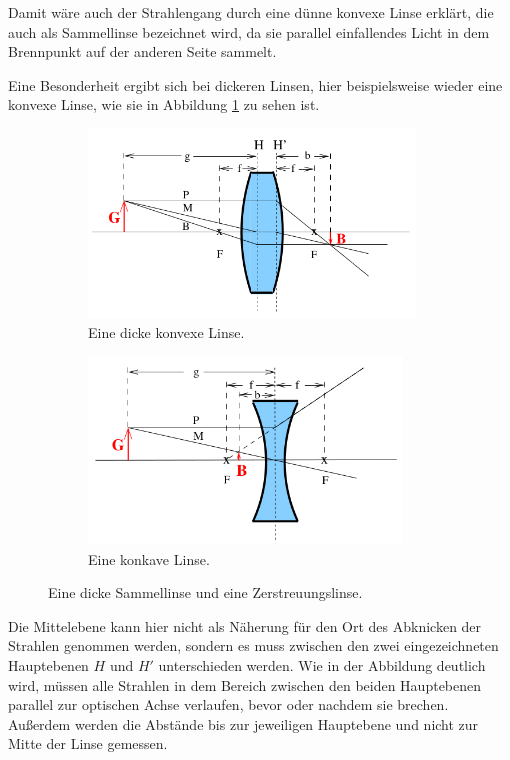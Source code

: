 Damit wäre auch der Strahlengang durch eine dünne konvexe Linse erklärt, die auch als Sammellinse bezeichnet wird, 
da sie parallel einfallendes Licht in dem Brennpunkt auf der anderen Seite sammelt. 

Eine Besonderheit ergibt sich bei dickeren Linsen, hier beispielsweise wieder eine konvexe Linse, wie sie in Abbildung  
\ref{fig:konvex_dick} zu sehen ist. 
\begin{figure}
    \centering
    \begin{subfigure}{0.48\textwidth}
        \centering
        \includegraphics[height=5cm]{plots/Linse3.png}
        \caption{Eine dicke konvexe Linse\cite{Versuchsanleitung}.}
        \label{fig:konvex_dick}
    \end{subfigure}
    \begin{subfigure}{0.48\textwidth}
        \centering
        \includegraphics[height=5cm]{plots/Linse2.png}
        \caption{Eine konkave Linse\cite{Versuchsanleitung}.}
        \label{fig:konkav}
    \end{subfigure}
    \caption{Eine dicke Sammellinse und eine Zerstreuungslinse.}
    \label{fig:konvex_konkav}
\end{figure}
Die Mittelebene kann hier nicht als Näherung für den Ort des Abknicken der Strahlen genommen werden, sondern es muss 
zwischen den zwei eingezeichneten Hauptebenen $H$ und $H'$ unterschieden werden. Wie in der Abbildung deutlich wird, 
müssen alle Strahlen in dem Bereich zwischen den beiden Hauptebenen parallel zur optischen Achse verlaufen, bevor oder nachdem 
sie brechen. 
Außerdem werden die Abstände bis zur jeweiligen Hauptebene und nicht zur Mitte der Linse gemessen. 

